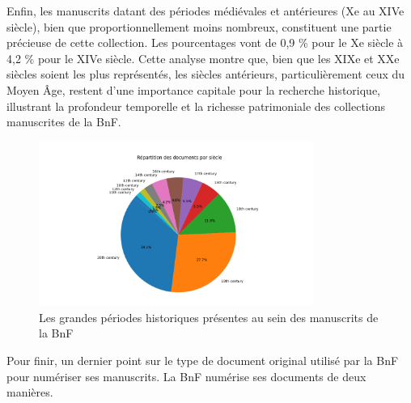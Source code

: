 \documentclass[a4paper,12pt,twoside]{book}
\begin{document}
	Enfin, les manuscrits datant des périodes médiévales et antérieures (Xe au XIVe siècle), bien que proportionnellement moins nombreux, constituent une partie précieuse de cette collection. Les pourcentages vont de 0,9 \% pour le Xe siècle à 4,2 \% pour le XIVe siècle. Cette analyse montre que, bien que les XIXe et XXe siècles soient les plus représentés, les siècles antérieurs, particulièrement ceux du Moyen Âge, restent d’une importance capitale pour la recherche historique, illustrant la profondeur temporelle et la richesse patrimoniale des collections manuscrites de la BnF. 
	\\
	\begin{figure}[h!]
		\centering
		\includegraphics[width=0.8\textwidth]{images/siecle_mss_bnf.png}
		\caption{Les grandes périodes historiques présentes au sein des manuscrits de la BnF}
		\label{fig:monimage}
	\end{figure}
	
	Pour finir, un dernier point sur le type de document original utilisé par la BnF pour numériser ses manuscrits. La BnF numérise ses documents de deux manières.
	
\end{document}

